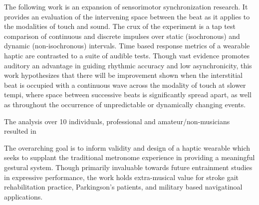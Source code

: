 
\setlength{\parskip}{1em}
\setlength{\parindent}{0em}

\noindent
\listoftodos
\pagebreak


The following work is an expansion of sensorimotor synchronization research. It provides an evaluation of the intervening space between the beat as it applies to the modalities of touch and sound. The crux of the experiment is a tap test comparison of continuous and discrete impulses over static (isochronous) and dynamic (non-isochronous) intervals. Time based response metrics of a wearable haptic are contrasted to a suite of audible tests. Though vast evidence promotes auditory an advantage in guiding rhythmic accuracy and low asynchronicity, this work hypothesizes that there will be improvement shown when the interstitial beat is occupied with a continuous wave across the modality of touch at slower tempi, where space between successive beats is significantly spread apart, as well as throughout the occurrence of unpredictable or dynamically changing events. 

The analysis over 10 individuals, professional and amateur/non-musicians resulted in 


The overarching goal is to inform validity and design of a haptic wearable which seeks to supplant the traditional metronome experience in providing a meaningful gestural system. Though primarily invaluable towards future entrainment studies in expressive performance, the work holds extra-musical value for stroke gait rehabilitation practice, Parkingson's patients, and military based navigatinoal applications.